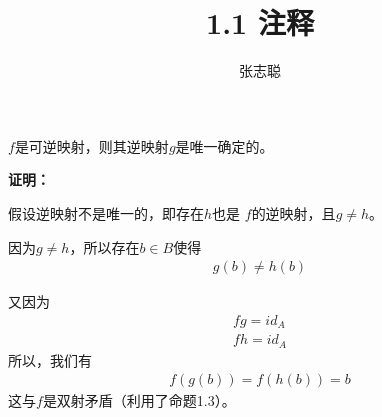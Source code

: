 \documentclass{article}
\begin{document}
\title{1.1 注释}
\author{张志聪}
\maketitle

\begin{zremark}
  $f$是可逆映射，则其逆映射$g$是唯一确定的。
\end{zremark}

\textbf{证明：}

假设逆映射不是唯一的，即存在$h$也是
$f$的逆映射，且$g \neq h$。

因为$g \neq h$，所以存在$b \in B$使得
\begin{align*}
  g(b) \neq h(b)
\end{align*}

又因为
\begin{align*}
  fg = id_{A} \\
  fh = id_{A}
\end{align*}
所以，我们有
\begin{align*}
  f(g(b)) = f(h(b)) = b
\end{align*}
这与$f$是双射矛盾（利用了命题1.3）。
\end{document}
